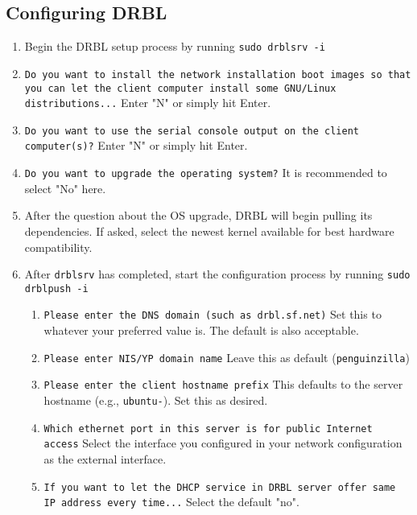 \documentclass{article}
\def\code#1{\texttt{#1}}
\begin{document}
\begin{flushleft}
\subsection{Configuring DRBL}
\begin{enumerate}
  \item Begin the DRBL setup process by running \code{sudo drblsrv -i}
  \item \code{Do you want to install the network installation boot images so that you can let the client computer install some GNU/Linux distributions...}\linebreak\linebreak
  Enter "N" or simply hit Enter.
  \item \code{Do you want to use the serial console output on the client computer(s)?}\linebreak\linebreak
  Enter "N" or simply hit Enter.
  \item \code{Do you want to upgrade the operating system?}\linebreak\linebreak
  It is recommended to select "No" here.
  \item After the question about the OS upgrade, DRBL will begin pulling its dependencies.  If asked, select the newest kernel available for best hardware compatibility.
  \item After \code{drblsrv} has completed, start the configuration process by running \code{sudo drblpush -i}
  \begin{enumerate}
    \item \code{Please enter the DNS domain (such as drbl.sf.net)}\linebreak\linebreak
    Set this to whatever your preferred value is.  The default is also acceptable.
    \item \code{Please enter NIS/YP domain name}\linebreak\linebreak
    Leave this as default (\code{penguinzilla})
    \item \code{Please enter the client hostname prefix}\linebreak\linebreak
    This defaults to the server hostname (e.g., \code{ubuntu-}).  Set this as desired.
    \item \code{Which ethernet port in this server is for public Internet access}\linebreak\linebreak
    Select the interface you configured in your network configuration as the external interface.
    \item \code{If you want to let the DHCP service in DRBL server offer same IP address every time...}\linebreak\linebreak
    Select the default "no".\linebreak\linebreak


\end{enumerate}
\end{enumerate}
\end{flushleft}
\end{document}
